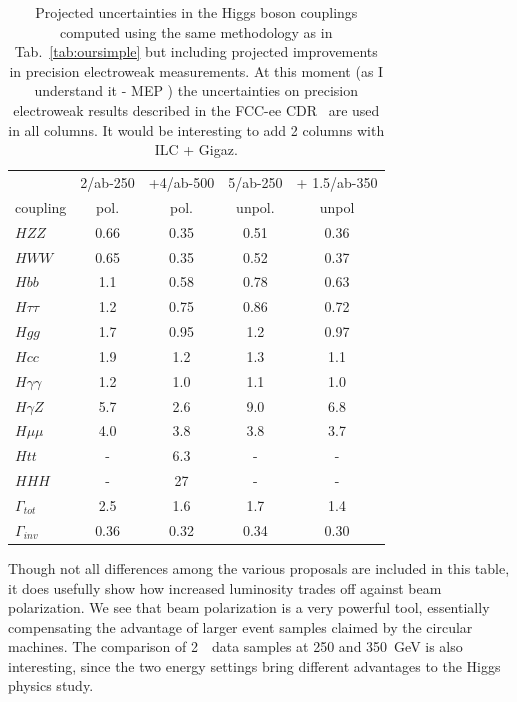 \begin{table}[!htbp]
\begin{center}
\begin{tabular}{l|cc|c|c}
 &  2/ab-250 & +4/ab-500 &  5/ab-250 &  + 1.5/ab-350\\
coupling &  pol.  &   pol.  &   unpol.  &  unpol  
  \\  \hline 
$HZZ$            &             0.66&   0.35    &   0.51   & 0.36            \\ 
$HWW$            &         0.65  &   0.35   &   0.52   &   0.37    \\ 
 $Hbb$            &     1.1  &  0.58   &  0.78    &    0.63       \\ 
$H\tau\tau$    &          1.2  &   0.75   &   0.86   &  0.72      \\ 
$Hgg$ &                      1.7  & 0.95       &  1.2    &  0.97     \\ 
$Hcc$                       &   1.9  &  1.2   &   1.3   &   1.1    \\ 
$H\gamma\gamma$ &  1.2 &   1.0     &  1.1    &   1.0   \\ 
$H\gamma Z$ &  5.7 &   2.6     &  9.0    &   6.8     \\
$H\mu\mu$                &  4.0  &  3.8     &  3.8    &  3.7   
 \\ 
$Htt$  &                       -     &      6.3     &  -    &  -     \\ 
$HHH$                         &  -    &   27     &   -   &   -  \\ \hline 
$\Gamma_{tot}$             & 2.5  & 1.6    &   1.7    &  1.4       \\  
$\Gamma_{inv}$          &   0.36  & 0.32    &  0.34    &   0.30  \\  \hline
\end{tabular}
\end{center}
\caption{ \label{tab:ournotsosimple}    Projected uncertainties in the Higgs
  boson couplings computed using the same methodology as
 in Tab.~\ref{tab:oursimple} but including projected improvements in
 precision electroweak measurements.  At this moment (as I understand it
 - MEP ) the uncertainties on precision electroweak results described
 in the 
 FCC-ee CDR~\cite{Benedikt:2018qee} are used in all columns.   It
 would be interesting to add 2 columns with ILC + Gigaz.}
\end{table}

Though not all differences among the various proposals are included in
this table, it does usefully show how increased luminosity trades off
against beam polarization.   We see that beam polarization is a very
powerful tool, essentially compensating the advantage of larger event
samples claimed by the circular machines.   The comparison of 2~\iab\
data samples at 250 and 350~GeV is also interesting, since the two
energy settings bring different advantages to the Higgs physics study.


